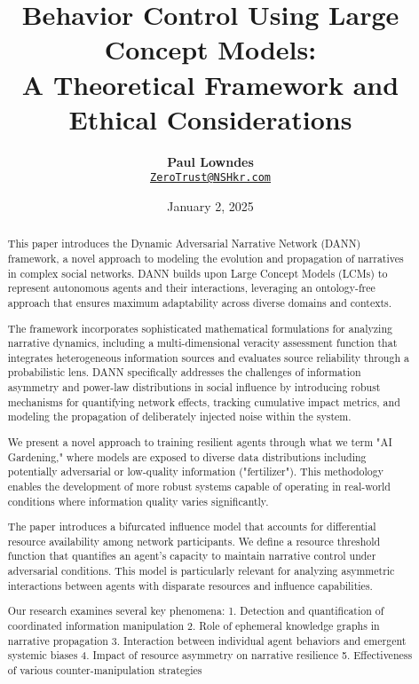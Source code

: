 \documentclass[12pt, a4paper]{article}
\title{\vspace{-2cm}\textbf{Behavior Control Using Large Concept Models: \\ A Theoretical Framework and Ethical Considerations}}
\author{\textbf{Paul Lowndes} \\ \href{mailto:ZeroTrust@NSHkr.com}{\texttt{ZeroTrust@NSHkr.com}}}
\date{\small January 2, 2025}
\begin{document}
\maketitle
\vspace{-1.5em} 


 

\begin{abstract}
This paper introduces the Dynamic Adversarial Narrative Network (DANN) framework, a novel approach to modeling the evolution and propagation of narratives in complex social networks. DANN builds upon Large Concept Models (LCMs) to represent autonomous agents and their interactions, leveraging an ontology-free approach that ensures maximum adaptability across diverse domains and contexts.

The framework incorporates sophisticated mathematical formulations for analyzing narrative dynamics, including a multi-dimensional veracity assessment function that integrates heterogeneous information sources and evaluates source reliability through a probabilistic lens. DANN specifically addresses the challenges of information asymmetry and power-law distributions in social influence by introducing robust mechanisms for quantifying network effects, tracking cumulative impact metrics, and modeling the propagation of deliberately injected noise within the system.

We present a novel approach to training resilient agents through what we term "AI Gardening," where models are exposed to diverse data distributions including potentially adversarial or low-quality information ("fertilizer"). This methodology enables the development of more robust systems capable of operating in real-world conditions where information quality varies significantly.

The paper introduces a bifurcated influence model that accounts for differential resource availability among network participants. We define a resource threshold function that quantifies an agent's capacity to maintain narrative control under adversarial conditions. This model is particularly relevant for analyzing asymmetric interactions between agents with disparate resources and influence capabilities.

Our research examines several key phenomena:
1. Detection and quantification of coordinated information manipulation
2. Role of ephemeral knowledge graphs in narrative propagation
3. Interaction between individual agent behaviors and emergent systemic biases
4. Impact of resource asymmetry on narrative resilience
5. Effectiveness of various counter-manipulation strategies


\end{abstract}
\end{document}
